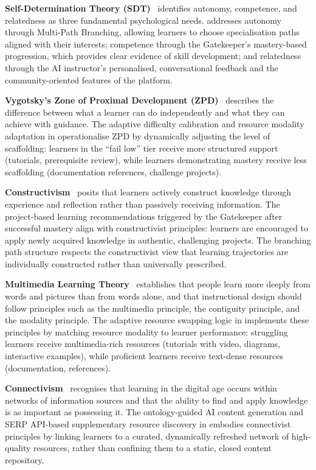 \textbf{Self-Determination Theory (SDT)}~\cite{ryan2000, deci1985} identifies autonomy, competence, and relatedness as three fundamental psychological needs. \projectname{} addresses autonomy through Multi-Path Branching, allowing learners to choose specialisation paths aligned with their interests; competence through the Gatekeeper's mastery-based progression, which provides clear evidence of skill development; and relatedness through the AI instructor's personalised, conversational feedback and the community-oriented features of the platform.

\textbf{Vygotsky's Zone of Proximal Development (ZPD)}~\cite{vygotsky1978} describes the difference between what a learner can do independently and what they can achieve with guidance. The adaptive difficulty calibration and resource modality adaptation in \projectname{} operationalise ZPD by dynamically adjusting the level of scaffolding: learners in the \enquote{fail low} tier receive more structured support (tutorials, prerequisite review), while learners demonstrating mastery receive less scaffolding (documentation references, challenge projects).

\textbf{Constructivism}~\cite{piaget1970, vygotsky1978} posits that learners actively construct knowledge through experience and reflection rather than passively receiving information. The project-based learning recommendations triggered by the Gatekeeper after successful mastery align with constructivist principles: learners are encouraged to apply newly acquired knowledge in authentic, challenging projects. The branching path structure respects the constructivist view that learning trajectories are individually constructed rather than universally prescribed.

\textbf{Multimedia Learning Theory}~\cite{mayer2009} establishes that people learn more deeply from words and pictures than from words alone, and that instructional design should follow principles such as the multimedia principle, the contiguity principle, and the modality principle. The adaptive resource swapping logic in \projectname{} implements these principles by matching resource modality to learner performance: struggling learners receive multimedia-rich resources (tutorials with video, diagrams, interactive examples), while proficient learners receive text-dense resources (documentation, references).

\textbf{Connectivism}~\cite{siemens2005} recognises that learning in the digital age occurs within networks of information sources and that the ability to find and apply knowledge is as important as possessing it. The ontology-guided AI content generation and SERP API-based supplementary resource discovery in \projectname{} embodies connectivist principles by linking learners to a curated, dynamically refreshed network of high-quality resources, rather than confining them to a static, closed content repository.


